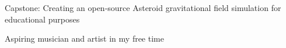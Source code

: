 \documentclass[11pt]{spidercv}
\begin{document}
\begin{MainPart}
    \vspace*{0.5cm}
        \begin{ItemList}{\ColorHighlight}
            \item [\faMortarBoard] Capstone: Creating an open-source Asteroid gravitational field simulation for educational purposes
            \item [\faRa] Aspiring musician and artist in my free time
        \end{ItemList}


    \end{MainPart}

    
\end{document}
